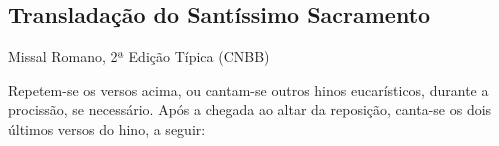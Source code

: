 \subsection{Transladação do Santíssimo Sacramento}\label{subsection:hebdomada-sancta/missa-in-cena-domini/ad-translatione-ssmi-sacramenti}
\begin{annotation}
  Missal Romano, 2ª Edição Típica (CNBB)
\end{annotation}
\begin{rubrica}
  Repetem-se os versos acima, ou cantam-se outros hinos eucarísticos, durante a procissão, se necessário. Após a chegada ao altar da reposição, canta-se os dois últimos versos do hino, a seguir:
\end{rubrica}

